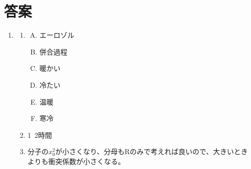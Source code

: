 \documentclass{jsarticle}
\newenvironment{problems}
{
  \renewcommand\labelenumi{\doublebox{\arabic{enumi}}}
  \begin{enumerate}
}{
  \end{enumerate}
  \renewcommand\labelenumi{\arabic{enumi}.}
}
\begin{document}
\section{答案}
\begin{problems}
\item 
\begin{enumerate}[(1)]
\item
	\begin{enumerate}[(A)]
		\item エーロゾル
		\item 併合過程
		\item 暖かい
		\item 冷たい
		\item 温暖
		\item 寒冷
	\end{enumerate}

\item 1~2時間
\item 分子の$x_0^2$が小さくなり、分母もRのみで考えれば良いので、大きいときよりも衝突係数が小さくなる。


\end{enumerate}
\end{problems}
\end{document}
